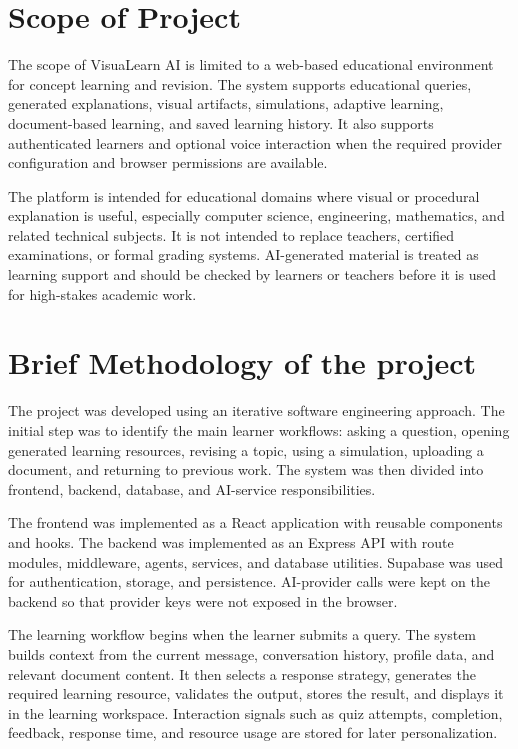 \section[Scope of Project]{\textbf{Scope of Project}}

The scope of VisuaLearn AI is limited to a web-based educational environment for concept learning and revision. The system supports educational queries, generated explanations, visual artifacts, simulations, adaptive learning, document-based learning, and saved learning history. It also supports authenticated learners and optional voice interaction when the required provider configuration and browser permissions are available.

The platform is intended for educational domains where visual or procedural explanation is useful, especially computer science, engineering, mathematics, and related technical subjects. It is not intended to replace teachers, certified examinations, or formal grading systems. AI-generated material is treated as learning support and should be checked by learners or teachers before it is used for high-stakes academic work.

\section[Brief Methodology of the project]{\textbf{Brief Methodology of the project}}

The project was developed using an iterative software engineering approach. The initial step was to identify the main learner workflows: asking a question, opening generated learning resources, revising a topic, using a simulation, uploading a document, and returning to previous work. The system was then divided into frontend, backend, database, and AI-service responsibilities.

The frontend was implemented as a React application with reusable components and hooks. The backend was implemented as an Express API with route modules, middleware, agents, services, and database utilities. Supabase was used for authentication, storage, and persistence. AI-provider calls were kept on the backend so that provider keys were not exposed in the browser.

The learning workflow begins when the learner submits a query. The system builds context from the current message, conversation history, profile data, and relevant document content. It then selects a response strategy, generates the required learning resource, validates the output, stores the result, and displays it in the learning workspace. Interaction signals such as quiz attempts, completion, feedback, response time, and resource usage are stored for later personalization.

